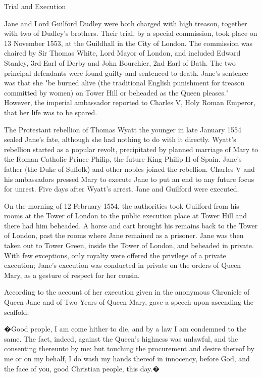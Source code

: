 \documentclass{article}
\begin{document}
Trial and Execution

Jane and Lord Guilford Dudley were both charged with high treason, together with two of Dudley's brothers.  Their trial, by a special commission, took place on 13 November 1553, at the Guildhall in the City of London. The commission was chaired by Sir Thomas White, Lord Mayor of London, and included Edward Stanley, 3rd Earl of Derby and John Bourchier, 2nd Earl of Bath. The two principal defendants were found guilty and sentenced to death. Jane's sentence was that she "be burned alive (the traditional English punishment for treason committed by women) on Tower Hill or beheaded as the Queen pleases." However, the imperial ambassador reported to Charles V, Holy Roman Emperor, that her life was to be spared.

The Protestant rebellion of Thomas Wyatt the younger in late January 1554 sealed Jane's fate, although she had nothing to do with it directly. Wyatt's rebellion started as a popular revolt, precipitated by planned marriage of Mary to the Roman Catholic Prince Philip, the future King Philip II of Spain. Jane's father (the Duke of Suffolk) and other nobles joined the rebellion. Charles V and his ambassadors pressed Mary to execute Jane to put an end to any future focus for unrest. Five days after Wyatt's arrest, Jane and Guilford were executed.

On the morning of 12 February 1554, the authorities took Guilford from his rooms at the Tower of London to the public execution place at Tower Hill and there had him beheaded. A horse and cart brought his remains back to the Tower of London, past the rooms where Jane remained as a prisoner. Jane was then taken out to Tower Green, inside the Tower of London, and beheaded in private. With few exceptions, only royalty were offered the privilege of a private execution; Jane's execution was conducted in private on the orders of Queen Mary, as a gesture of respect for her cousin.

According to the account of her execution given in the anonymous Chronicle of Queen Jane and of Two Years of Queen Mary, gave a speech upon ascending the scaffold:

�Good people, I am come hither to die, and by a law I am condemned to the same. The fact, indeed, against the Queen's highness was unlawful, and the consenting thereunto by me: but touching the procurement and desire thereof by me or on my behalf, I do wash my hands thereof in innocency, before God, and the face of you, good Christian people, this day.�
\end{document}
